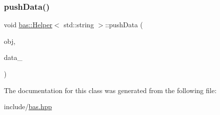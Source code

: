 \mbox{\label{classbas_1_1Helper_3_01std_1_1string_01_4_a0920a17eddecfc9f5e54fd66638512ea}} 
\subsubsection{\texorpdfstring{pushData()}{pushData()}}
{\footnotesize\ttfamily void \mbox{\hyperlink{classbas_1_1Helper}{bas\+::\+Helper}}$<$ std\+::string $>$\+::push\+Data (\begin{DoxyParamCaption}\item[{\mbox{\hyperlink{classbas_1_1SerializedObject}{Serialized\+Object}} \&}]{obj,  }\item[{const std\+::string \&}]{data\+\_\+ }\end{DoxyParamCaption})\hspace{0.3cm}{\ttfamily [inline]}}



The documentation for this class was generated from the following file\+:\begin{DoxyCompactItemize}
\item 
include/\mbox{\hyperlink{bas_8hpp}{bas.\+hpp}}\end{DoxyCompactItemize}
